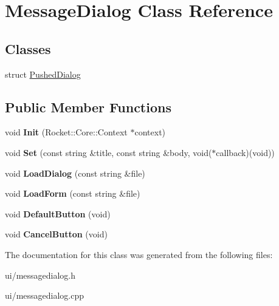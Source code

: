 \hypertarget{classMessageDialog}{\section{\-Message\-Dialog \-Class \-Reference}
\label{classMessageDialog}
}
\subsection*{\-Classes}
\begin{DoxyCompactItemize}
\item 
struct \hyperlink{structMessageDialog_1_1PushedDialog}{\-Pushed\-Dialog}
\end{DoxyCompactItemize}
\subsection*{\-Public \-Member \-Functions}
\begin{DoxyCompactItemize}
\item 
\hypertarget{classMessageDialog_a0c8cdd1d7e9c7fbf0905cdb2ffcb9675}{void {\bfseries \-Init} (\-Rocket\-::\-Core\-::\-Context $\ast$context)}\label{classMessageDialog_a0c8cdd1d7e9c7fbf0905cdb2ffcb9675}

\item 
\hypertarget{classMessageDialog_ad4ccfe54856deb6f83f8a548df263e41}{void {\bfseries \-Set} (const string \&title, const string \&body, void($\ast$callback)(void))}\label{classMessageDialog_ad4ccfe54856deb6f83f8a548df263e41}

\item 
\hypertarget{classMessageDialog_a7d17b5e0d2676c2226fd67ac94f5ea6a}{void {\bfseries \-Load\-Dialog} (const string \&file)}\label{classMessageDialog_a7d17b5e0d2676c2226fd67ac94f5ea6a}

\item 
\hypertarget{classMessageDialog_af24feb2f7bcda32819813aad7f9cc8e1}{void {\bfseries \-Load\-Form} (const string \&file)}\label{classMessageDialog_af24feb2f7bcda32819813aad7f9cc8e1}

\item 
\hypertarget{classMessageDialog_a829df89e12ae5b0ae23788c5e470478f}{void {\bfseries \-Default\-Button} (void)}\label{classMessageDialog_a829df89e12ae5b0ae23788c5e470478f}

\item 
\hypertarget{classMessageDialog_a97bda7cf047b44cb692aac94cc0a0c59}{void {\bfseries \-Cancel\-Button} (void)}\label{classMessageDialog_a97bda7cf047b44cb692aac94cc0a0c59}

\end{DoxyCompactItemize}


\-The documentation for this class was generated from the following files\-:\begin{DoxyCompactItemize}
\item 
ui/messagedialog.\-h\item 
ui/messagedialog.\-cpp\end{DoxyCompactItemize}
